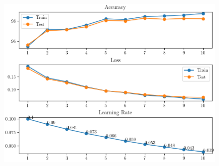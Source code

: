 \documentclass[10pt,a4paper,fullpage]{article}
\begin{document}
\begin{figure}
	\begin{center}
%		
		\includegraphics[scale=1]{cnn_model_plot.png}
	\end{center}
\end{figure}
\end{document}

